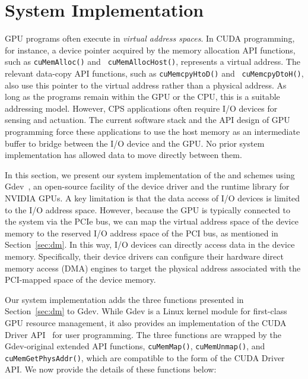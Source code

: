 \section{System Implementation}
\label{sec:implementation}

GPU programs often execute in \textit{virtual address spaces}.
In CUDA programming, for instance, a device pointer acquired by the
memory allocation API functions, such as {\tt cuMemAlloc()} and {\tt
cuMemAllocHost()}, represents a virtual address.
The relevant data-copy API functions, such as {\tt cuMemcpyHtoD()} and {\tt
cuMemcpyDtoH()}, also use this pointer to the virtual address rather
than a physical address.
As long as the programs remain within the GPU or the CPU, this is a
suitable addressing model.
However, CPS applications often require I/O devices for sensing and
actuation.
The current software stack and the API design of GPU programming force
these applications to use the host memory as an intermediate buffer to
bridge between the I/O device and the GPU.
No prior system implementation has allowed data to move directly between
them. 

In this section, we present our system implementation of the {\dm} and
{\dmh} schemes using Gdev~\cite{Kato_ATC12}, an open-source facility of
the device driver and the runtime library for NVIDIA GPUs.
A key limitation is that the data access of I/O devices is limited to
the I/O address space.
However, because the GPU is typically connected to the system via the
PCIe bus, we can map the virtual address space of the device memory to
the reserved I/O address space of the PCI bus, as mentioned in
Section~\ref{sec:dm}.
In this way, I/O devices can directly access data in the device memory.
Specifically, their device drivers can configure their hardware direct
memory access (DMA) engines to target the physical address associated
with the PCI-mapped space of the device memory.

Our system implementation adds the three functions presented in
Section~\ref{sec:dm} to Gdev.
While Gdev is a Linux kernel module for first-class GPU resource
management, it also provides an implementation of the CUDA Driver
API~\cite{CUDA} for user programming.
The three functions are wrapped by the Gdev-original extended API
functions, {\tt cuMemMap()}, {\tt cuMemUnmap()}, and {\tt
cuMemGetPhysAddr()}, which are compatible to the form of the CUDA Driver
API.
We now provide the details of these functions below:


